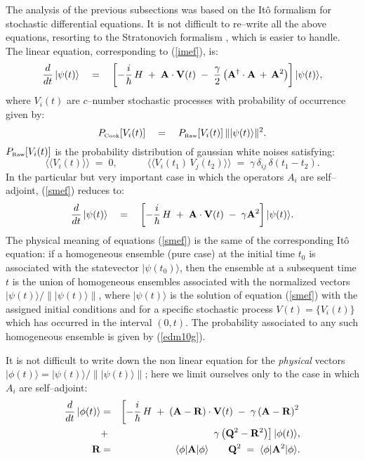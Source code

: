 \documentclass[10pt,a4paper]{article}
\newcommand{\llangle}{\langle\!\langle}
\newcommand{\rrangle}{\rangle\!\rangle}
\begin{document}
The analysis of the previous subsections was based on the It\^o
formalism for stochastic differential equations. It is not
difficult to re--write all the above equations, resorting to the
Stratonovich formalism \cite{arn}, which is easier to handle. The
linear equation, corresponding to (\ref{imef}), is:
\begin{equation} \label{smef}
\frac{d}{dt}\, |\psi(t)\rangle \quad = \quad \left[
-\frac{i}{\hbar}\, H \; + \; {\bf A}\cdot {\bf V}(t) \; - \;
\frac{\gamma}{2} \left( {\bf A}^{\dagger}\cdot {\bf A} \, + \,
{\bf A}^{2}\right) \right] |\psi(t)\rangle,
\end{equation}
where $V_{i}(t)$ are $c$--number stochastic processes with
probability of occurrence given by:
\begin{equation} \label{edm10g}
P_{\makebox{\tiny Cook}}[V_{i}(t)] \quad = \quad P_{\makebox{\tiny
Raw}}[V_{i}(t)]\, \||\psi(t)\rangle\|^{2}.
\end{equation}
$P_{\makebox{\tiny Raw}}[V_{i}(t)]$ is the probability
distribution of gaussian white noises satisfying:
\begin{equation} \label{probwn}
\llangle V_{i}(t) \rrangle \; = \; 0, \qquad \quad \llangle
V_{i}(t_{1})\, V_{j}(t_{2}) \rrangle \; = \; \gamma\,\delta_{ij}\,
\delta(t_{1} - t_{2}).
\end{equation}
In the particular but very important case in which the operators
$A_{i}$ are self--adjoint, (\ref{smef}) reduces to:
\begin{equation} \label{smefsa}
\frac{d}{dt}\, |\psi(t)\rangle \quad = \quad \left[
-\frac{i}{\hbar}\, H \; + \; {\bf A}\cdot {\bf V}(t) \; - \;
\gamma {\bf A}^{2}\right] |\psi(t)\rangle.
\end{equation}
The physical meaning of equations (\ref{smef}) is the same of the
corresponding It\^o equation: if a homogeneous ensemble (pure
case) at the initial time $t_{0}$ is associated with the
statevector $|\psi(t_{0})\rangle$, then the ensemble at a
subsequent time $t$ is the union of homogeneous ensembles
associated with the normalized vectors $|\psi(t)\rangle/\|
|\psi(t)\rangle \|$, where $|\psi(t)\rangle$ is the solution of
equation (\ref{smef}) with the assigned initial conditions and for
a specific stochastic process $V(t) = \{ V_{i}(t) \}$ which has
occurred in the interval $(0,t)$. The probability associated to
any such homogeneous ensemble is given by (\ref{edm10g}).

It is not difficult to write down the non linear equation for the
{\it physical} vectors $|\phi(t)\rangle = |\psi(t)\rangle/\|
|\psi(t)\rangle \|$; here we limit ourselves only to the case in
which $A_{i}$ are self--adjoint:
\begin{eqnarray} \label{qelaoj}
\frac{d}{dt}\, |\phi(t)\rangle & = & \left[ -\frac{i}{\hbar}\, H\;
+ \; \left( {\bf A} - {\bf R} \right)\cdot {\bf V}(t) \; - \;
\gamma \left( {\bf A} - {\bf R} \right)^{2} \right. \nonumber
\\
& + & \left. \gamma \left( {\bf Q}^{2} - {\bf R}^{2} \right)
\right] |\phi(t)\rangle,
\\
{\bf R} & = & \langle\phi| {\bf A} |\phi\rangle \qquad {\bf Q}^{2}
\; = \; \langle\phi| {\bf A}^{2} |\phi\rangle \nonumber.
\end{eqnarray}
\end{document}
